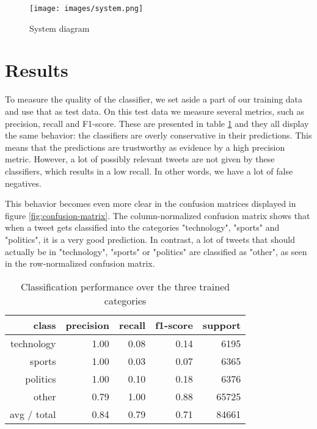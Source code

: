 \documentclass{llncs}
\begin{document}
\begin{figure}[H]
  \centering
  \texttt{[image: images/system.png]}
  \caption{System diagram}
  \label{fig:System diagram}
\end{figure}

\section{Results}

To measure the quality of the classifier, we set aside a part of our training data and use that as test data. On this test data we measure several metrics, such as precision, recall and F1-score. These are presented in table \ref{tbl:classification-report} and they all display the same behavior: the classifiers are overly conservative in their predictions. This means that the predictions are trustworthy as evidence by a high precision metric. However, a lot of possibly relevant tweets are not given by these classifiers, which results in a low recall. In other words, we have a lot of false negatives. 

This behavior becomes even more clear in the confusion matrices displayed in figure \ref{fig:confusion-matrix}. The column-normalized confusion matrix shows that when a tweet gets classified into the categories "technology", "sports" and "politics", it is a very good prediction. In contrast, a lot of tweets that should actually be in "technology", "sports" or "politics" are classified as "other", as seen in the row-normalized confusion matrix.

\begin{table}
\begin{center}
\begin{tabular}{|r|r|r|r|r|} \hline
class  & precision   & recall & f1-score  & support \\ \hline
 technology    &   1.00 &     0.08  &    0.14   &   6195 \\
     sports   &    1.00   &   0.03   &   0.07   &   6365 \\
   politics   &    1.00  &    0.10   &   0.18   &   6376 \\
      other   &    0.79 &     1.00  &    0.88   &  65725 \\ \hline
avg / total  &     0.84   &   0.79  &    0.71   &  84661 \\ \hline
\end{tabular}
\end{center}
\caption{Classification performance over the three trained categories}
\label{tbl:classification-report}
\end{table}
 
\end{document}
